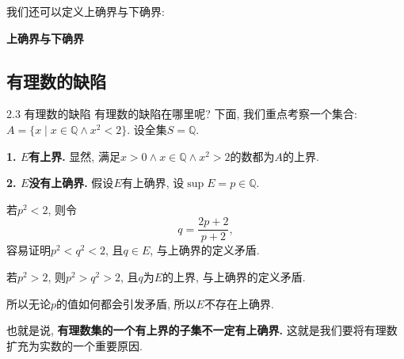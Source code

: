 \documentclass[serif]{beamer}
\begin{document}
\begin{frame}
	我们还可以定义上确界与下确界:\par
	\textbf{上确界与下确界}
\end{frame}

\subsection{\kaishu 有理数的缺陷}

\begin{frame}{2.3 有理数的缺陷}
	有理数的缺陷在哪里呢? 下面, 我们重点考察一个集合: $A=\{x\mid x\in\mathbb{Q}\wedge x^2<2\}$. 设全集$S=\mathbb{Q}$.\par
	\textbf{1. $E$有上界. }显然, 满足$x>0\wedge x\in\mathbb{Q}\wedge x^2>2$的数都为$A$的上界.\par
	\textbf{2. $E$没有上确界. }假设$E$有上确界, 设$\sup E=p\in\mathbb{Q}$.\par
	若$p^2<2$, 则令
	\[q=\frac{2p+2}{p+2},\]
	容易证明$p^2<q^2<2$, 且$q\in E$, 与上确界的定义矛盾.\par
	若$p^2>2$, 则$p^2>q^2>2$, 且$q$为$E$的上界, 与上确界的定义矛盾.\par
	所以无论$p$的值如何都会引发矛盾, 所以$E$不存在上确界.
\end{frame}

\begin{frame}
	也就是说, \textbf{有理数集的一个有上界的子集不一定有上确界. }这就是我们要将有理数扩充为实数的一个重要原因.
\end{frame}
\end{document}
